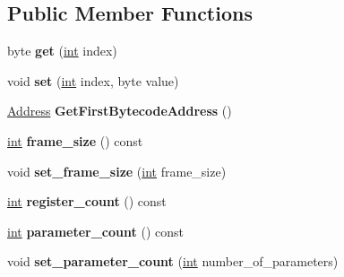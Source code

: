 \subsection*{Public Member Functions}
\begin{DoxyCompactItemize}
\item 
\mbox{\label{classv8_1_1internal_1_1BytecodeArray_a87384adc223d364eb30b477bc6ffcad2}} 
byte {\bfseries get} (\mbox{\hyperlink{classint}{int}} index)
\item 
\mbox{\label{classv8_1_1internal_1_1BytecodeArray_a050bfac7ec5133ffc2648a16baf57207}} 
void {\bfseries set} (\mbox{\hyperlink{classint}{int}} index, byte value)
\item 
\mbox{\label{classv8_1_1internal_1_1BytecodeArray_a87e82c77346fa5b4697d440818e32257}} 
\mbox{\hyperlink{classuintptr__t}{Address}} {\bfseries Get\+First\+Bytecode\+Address} ()
\item 
\mbox{\label{classv8_1_1internal_1_1BytecodeArray_a838793c9d4b515ff6ca9c2d558fca65f}} 
\mbox{\hyperlink{classint}{int}} {\bfseries frame\+\_\+size} () const
\item 
\mbox{\label{classv8_1_1internal_1_1BytecodeArray_a3e42fb5985e884a966420756db4bc961}} 
void {\bfseries set\+\_\+frame\+\_\+size} (\mbox{\hyperlink{classint}{int}} frame\+\_\+size)
\item 
\mbox{\label{classv8_1_1internal_1_1BytecodeArray_a9eb1b189e5d9b6975805c8fbc8abe176}} 
\mbox{\hyperlink{classint}{int}} {\bfseries register\+\_\+count} () const
\item 
\mbox{\label{classv8_1_1internal_1_1BytecodeArray_aaacef588cd4a17f01a04a0346352381f}} 
\mbox{\hyperlink{classint}{int}} {\bfseries parameter\+\_\+count} () const
\item 
\mbox{\label{classv8_1_1internal_1_1BytecodeArray_a5e642ff36f731ddbd7516d4761236d5d}} 
void {\bfseries set\+\_\+parameter\+\_\+count} (\mbox{\hyperlink{classint}{int}} number\+\_\+of\+\_\+parameters)

\end{DoxyCompactItemize}
